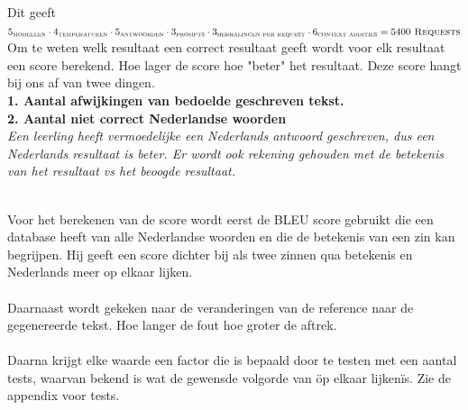 \documentclass[12pt]{article}
\begin{document}
\vspace{3em}
Dit geeft \large$5_{\textsc{modellen}} \cdot 4_{\textsc{temperaturen}}  \cdot 5_{\textsc{antwoorden}} \cdot 3_{\textsc{prompts}}  \cdot 3_{\textsc{herhalingen per request}}  \cdot 6_{\textsc{context addities}}= 5400 \textsc{ Requests}$ \normalsize
Om te weten welk resultaat een correct resultaat geeft wordt voor elk resultaat een score berekend. Hoe lager de score hoe "beter" het resultaat. Deze score hangt bij ons af van twee dingen. \\
\textbf{1. Aantal afwijkingen van bedoelde geschreven tekst.}\\
\textbf{2. Aantal niet correct Nederlandse woorden}\\
\hspace{3em}\textit{Een leerling heeft vermoedelijke een Nederlands antwoord geschreven, dus een Nederlands resultaat is beter. Er wordt ook rekening gehouden met de betekenis van het resultaat vs het beoogde resultaat.}\\
\\
\begin{minipage}{0.5\linewidth}
Voor het berekenen van de score wordt eerst de BLEU score gebruikt die een database heeft van alle Nederlandse woorden en die de betekenis van een zin kan begrijpen. Hij geeft een score dichter bij als twee zinnen qua betekenis en Nederlands meer op elkaar lijken. \\
\\
Daarnaast wordt gekeken naar de veranderingen van de reference naar de gegenereerde tekst. Hoe langer de fout hoe groter de aftrek. \\
\\
Daarna krijgt elke waarde een factor die is bepaald door te testen met een aantal tests, waarvan bekend is wat de gewensde volgorde van \"op elkaar lijken\" is. 
Zie de appendix voor tests.
\end{minipage}%
\end{document}

